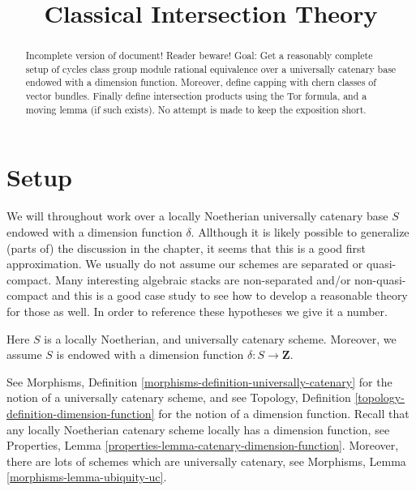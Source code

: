 

%


\title{Classical Intersection Theory}

\begin{abstract}
Incomplete version of document! Reader beware!
Goal: Get a reasonably complete setup of
cycles class group module rational equivalence
over a universally catenary base endowed with a dimension
function. Moreover, define capping with chern classes of
vector bundles. Finally define intersection products using
the Tor formula, and a moving lemma (if such exists).
No attempt is made to keep the exposition short.
\end{abstract}

\maketitle

\label{section-phantom}


\tableofcontents

\section{Setup}
\label{section-setup}

\noindent
We will throughout work over a locally Noetherian universally
catenary base $S$ endowed with a dimension function $\delta$.
Allthough it is likely possible to generalize (parts of) the
discussion in the chapter, it seems that this is a good first
approximation. We usually do not assume our schemes are
separated or quasi-compact. Many interesting algebraic stacks
are non-separated and/or non-quasi-compact and this is a good
case study to see how to develop a reasonable theory for those as well.
In order to reference these hypotheses we give it a number.

\begin{situation}
\label{situation-setup}
Here $S$ is a locally Noetherian, and universally catenary scheme.
Moreover, we assume $S$ is endowed with a dimension function
$\delta : S \longrightarrow \mathbf{Z}$.
\end{situation}

\noindent
See Morphisms, Definition \ref{morphisms-definition-universally-catenary}
for the notion of a universally catenary scheme, and see
Topology, Definition \ref{topology-definition-dimension-function}
for the notion of a dimension function. Recall that any locally
Noetherian catenary scheme locally has a dimension function, see
Properties, Lemma \ref{properties-lemma-catenary-dimension-function}.
Moreover, there are lots of schemes which are universally catenary,
see Morphisms, Lemma \ref{morphisms-lemma-ubiquity-uc}.

